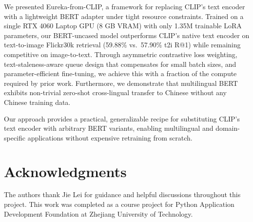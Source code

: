 \documentclass[10pt,leqno]{amsart}
\begin{document}
We presented Eureka-from-CLIP, a framework for replacing CLIP's text encoder with a lightweight BERT adapter under tight resource constraints. Trained on a single RTX 4060 Laptop GPU (8 GB VRAM) with only 1.35M trainable LoRA parameters, our BERT-uncased model outperforms CLIP's native text encoder on text-to-image Flickr30k retrieval (59.88\% vs.~57.90\% t2i R@1) while remaining competitive on image-to-text. Through asymmetric contrastive loss weighting, text-staleness-aware queue design that compensates for small batch sizes, and parameter-efficient fine-tuning, we achieve this with a fraction of the compute required by prior work. Furthermore, we demonstrate that multilingual BERT exhibits non-trivial zero-shot cross-lingual transfer to Chinese without any Chinese training data.

Our approach provides a practical, generalizable recipe for substituting CLIP's text encoder with arbitrary BERT variants, enabling multilingual and domain-specific applications without expensive retraining from scratch.

\section*{Acknowledgments}

The authors thank Jie Lei for guidance and helpful discussions throughout this project. This work was completed as a course project for Python Application Development Foundation at Zhejiang University of Technology.

\bigskip
\end{document}
